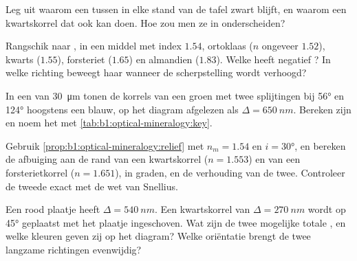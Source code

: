 \begin{exercise}[$\star$]\label{exo:b1:optical-mineralogy:3}
Leg uit waarom een  tussen  in elke stand van de tafel zwart blijft, en waarom een kwartskorrel dat ook kan doen. Hoe zou men ze in
 onderscheiden?
\end{exercise}

\begin{exercise}[$\star$]\label{exo:b1:optical-mineralogy:4}
Rangschik naar , in een middel met index $1.54$, ortoklaas ($n$ ongeveer $1.52$), kwarts ($1.55$), forsteriet ($1.65$) en almandien ($1.83$). Welke heeft negatief
? In welke richting beweegt haar  wanneer de scherpstelling wordt verhoogd?
\end{exercise}

\begin{exercise}[$\star\star$]\label{exo:b1:optical-mineralogy:5}
In een  van \qty{30}{\micro m} tonen de korrels van een groen   met twee splijtingen bij \ang{56} en \ang{124} hoogstens een 
blauw, op het diagram afgelezen als $\Delta = \qty{650}{nm}$. Bereken zijn  en noem het  met \cref{tab:b1:optical-mineralogy:key}.
\end{exercise}

\begin{exercise}[$\star\star$]\label{exo:b1:optical-mineralogy:6}
Gebruik \cref{prop:b1:optical-mineralogy:relief} met $n_m = 1.54$ en $i = \ang{30}$, en bereken de afbuiging aan de rand van een kwartskorrel ($n = 1.553$) en van een
forsterietkorrel ($n = 1.651$), in graden, en de verhouding van de twee. Controleer de tweede exact met de wet van Snellius.
\end{exercise}

\begin{exercise}[$\star\star$]\label{exo:b1:optical-mineralogy:7}
Een  rood plaatje heeft $\Delta = \qty{540}{nm}$. Een kwartskorrel van $\Delta = \qty{270}{nm}$ wordt op \ang{45} geplaatst met het plaatje ingeschoven. Wat zijn
de twee mogelijke totale , en welke kleuren geven zij op het diagram? Welke oriëntatie brengt de twee langzame richtingen evenwijdig?
\end{exercise}

